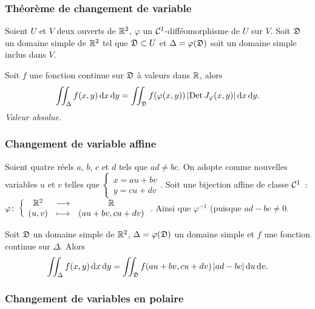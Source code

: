 \subsubsection{Théorème de changement de variable}

\begin{theo}
  Soient $U$ et $V$ deux ouverts de $\mathbb{R}^2$, $\varphi$ un $\mathcal{C}^{1}$-difféomorphisme de $U$ sur $V$. Soit $\mathfrak{D}$ un domaine simple de $\mathbb{R}^2$ tel que $\mathfrak{D} \subset U$ et $\Delta = \varphi(\mathfrak{D})$ soit un domaine simple inclus dans $V$.

  Soit $f$ une fonction continue sur $\mathfrak{D}$ à valeurs dans $\mathbb{R}$, alors
  \begin{equation}
    \iint_\Delta f(x,y)\mathop{}\mathopen{}\mathrm{d} x \mathop{}\mathopen{}\mathrm{d} y = \iint_{\mathfrak{D}} f(\varphi(x,y)) \left\lvert\operatorname{Det} J_\varphi(x,y)\right\rvert\mathop{}\mathopen{}\mathrm{d} x \mathop{}\mathopen{}\mathrm{d} y.
  \end{equation}
  \emph{Valeur absolue.}
\end{theo}

\subsubsection{Changement de variable affine}

\begin{theo}
  Soient quatre réels $a$, $b$, $c$ et $d$ tels que $ad \neq bc$. On adopte comme nouvelles variables $u$ et $v$ telles que $\begin{cases} x=au+bv \\ y=cu+dv \end{cases}$. Soit une bijection affine de classe $\mathcal{C}^{1}$~: $\varphi\colon \left\{\begin{array}{ccc} \mathbb{R}^2 & \longrightarrow &\mathbb{R}\\ (u,v) & \longmapsto & (au+bv, cu+dv) \end{array} \right.$. Ainsi que $\varphi^{-1}$ (puisque $ad-bc\neq 0$.

Soit $\mathfrak{D}$ un domaine simple de $\mathbb{R}^2$, $\Delta=\varphi(\mathfrak{D})$ un domaine simple et $f$ une fonction continue sur $\Delta$. Alors
\begin{equation}
  \iint_\Delta f(x,y)\mathop{}\mathopen{}\mathrm{d} x \mathop{}\mathopen{}\mathrm{d} y = \iint_{\mathfrak{D}} f(au+bv, cu+dv) \left\lvert ad-bc\right\rvert\mathop{}\mathopen{}\mathrm{d} u \mathop{}\mathopen{}\mathrm{d} v.
\end{equation}
\end{theo}

\subsubsection{Changement de variables en polaire}


